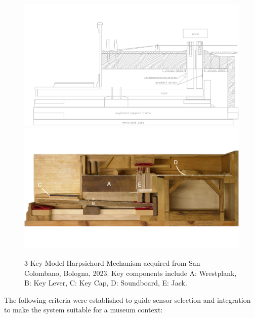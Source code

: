 \begin{figure}[b]
    \centering
    \includegraphics[width=\linewidth]{src/images/CrossSectionSensorPlacement.jpg}
    \\
    \includegraphics[width=\linewidth]{src/images/3-key-side-labelled.png}
    \caption{3-Key Model Harpsichord Mechanism acquired from San Colombano, Bologna, 2023. Key components include A: Wrestplank, B: Key Lever, C: Key Cap, D: Soundboard, E: Jack.}
    \label{fig:3key}
\end{figure}



The following criteria were established to guide sensor selection and integration to make the system suitable for a museum context:

